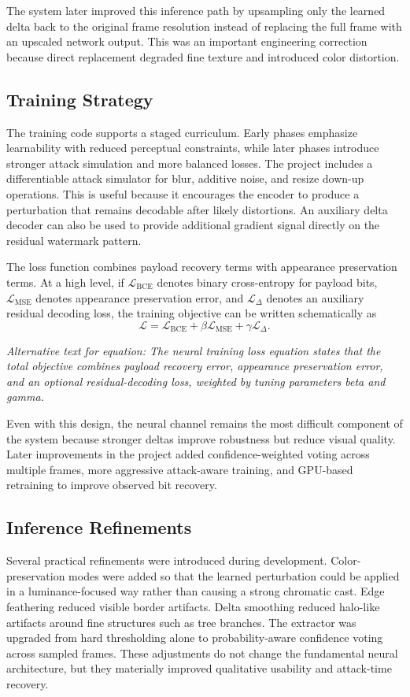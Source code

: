 \documentclass[12pt,oneside]{report}
\newcommand{\FormulaAlt}[1]{\par\small\textit{Alternative text for equation: #1}\normalsize}
\begin{document}
The system later improved this inference path by upsampling only the learned delta back to the original frame resolution instead of replacing the full frame with an upscaled network output. This was an important engineering correction because direct replacement degraded fine texture and introduced color distortion.

\subsection{Training Strategy}
The training code supports a staged curriculum. Early phases emphasize learnability with reduced perceptual constraints, while later phases introduce stronger attack simulation and more balanced losses. The project includes a differentiable attack simulator for blur, additive noise, and resize down-up operations. This is useful because it encourages the encoder to produce a perturbation that remains decodable after likely distortions. An auxiliary delta decoder can also be used to provide additional gradient signal directly on the residual watermark pattern.

The loss function combines payload recovery terms with appearance preservation terms. At a high level, if $\mathcal{L}_{\mathrm{BCE}}$ denotes binary cross-entropy for payload bits, $\mathcal{L}_{\mathrm{MSE}}$ denotes appearance preservation error, and $\mathcal{L}_{\Delta}$ denotes an auxiliary residual decoding loss, the training objective can be written schematically as
\begin{equation}
\mathcal{L} = \mathcal{L}_{\mathrm{BCE}} + \beta \mathcal{L}_{\mathrm{MSE}} + \gamma \mathcal{L}_{\Delta}.
\end{equation}
\FormulaAlt{The neural training loss equation states that the total objective combines payload recovery error, appearance preservation error, and an optional residual-decoding loss, weighted by tuning parameters beta and gamma.}

Even with this design, the neural channel remains the most difficult component of the system because stronger deltas improve robustness but reduce visual quality. Later improvements in the project added confidence-weighted voting across multiple frames, more aggressive attack-aware training, and GPU-based retraining to improve observed bit recovery.

\subsection{Inference Refinements}
Several practical refinements were introduced during development. Color-preservation modes were added so that the learned perturbation could be applied in a luminance-focused way rather than causing a strong chromatic cast. Edge feathering reduced visible border artifacts. Delta smoothing reduced halo-like artifacts around fine structures such as tree branches. The extractor was upgraded from hard thresholding alone to probability-aware confidence voting across sampled frames. These adjustments do not change the fundamental neural architecture, but they materially improved qualitative usability and attack-time recovery.
\end{document}
